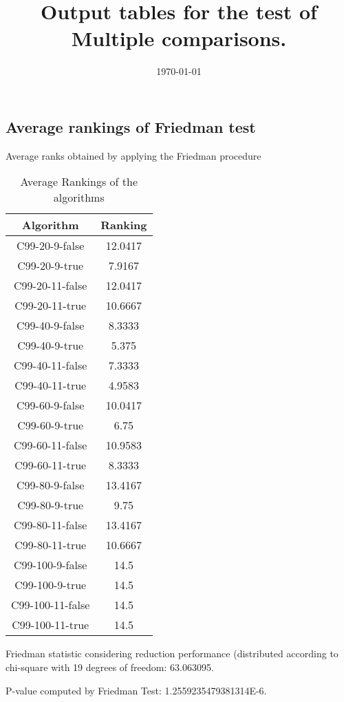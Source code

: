 \documentclass[a4paper,10pt]{article}
\title{Output tables for the test of Multiple comparisons.}
\author{}
\date{\today}
\begin{document}
\begin{landscape}
\pagestyle{empty}
\maketitle
\thispagestyle{empty}
\section{Average rankings of Friedman test}



Average ranks obtained by applying the Friedman procedure

\begin{table}[!htp]
\centering
\begin{tabular}{|c|c|}\hline
Algorithm&Ranking\\\hline
C99-20-9-false & 12.0417\\
C99-20-9-true & 7.9167\\
C99-20-11-false & 12.0417\\
C99-20-11-true & 10.6667\\
C99-40-9-false & 8.3333\\
C99-40-9-true & 5.375\\
C99-40-11-false & 7.3333\\
C99-40-11-true & 4.9583\\
C99-60-9-false & 10.0417\\
C99-60-9-true & 6.75\\
C99-60-11-false & 10.9583\\
C99-60-11-true & 8.3333\\
C99-80-9-false & 13.4167\\
C99-80-9-true & 9.75\\
C99-80-11-false & 13.4167\\
C99-80-11-true & 10.6667\\
C99-100-9-false & 14.5\\
C99-100-9-true & 14.5\\
C99-100-11-false & 14.5\\
C99-100-11-true & 14.5\\
\hline
\end{tabular}
\caption{Average Rankings of the algorithms}
\end{table}

Friedman statistic considering reduction performance (distributed according to chi-square with 19 degrees of freedom: 63.063095.

P-value computed by Friedman Test: 1.2559235479381314E-6.\newline




\end{landscape}
\end{document}
